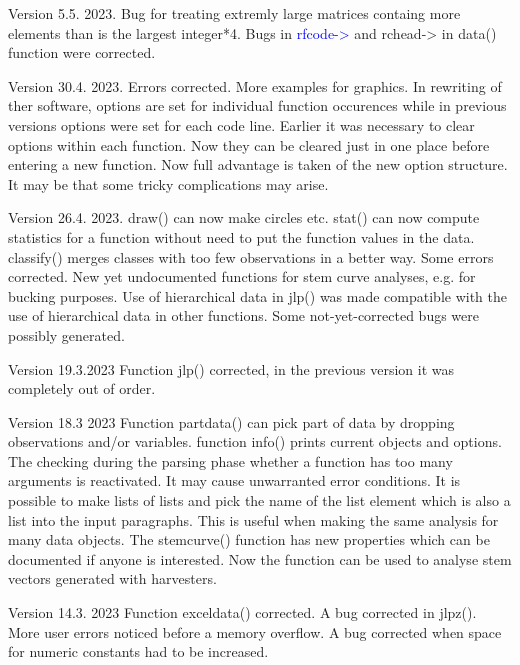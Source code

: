Version 5.5. 2023. Bug for treating extremly large matrices containg more elements than is the largest integer*4. 
Bugs in \textcolor{blue}{rfcode->} and rchead-> in \textcolor{VioletRed}{data}() function were corrected. 
 
Version 30.4. 2023. Errors corrected. More examples for graphics. In rewriting of ther software, 
options are set for individual function occurences while in previous versions 
options were set for each code line. Earlier it was necessary to clear options within each 
function. Now they can be cleared just in one place before entering a new function. Now 
full advantage is taken of the new option structure. It may be that some tricky complications 
may arise. 
 
Version 26.4. 2023. \textcolor{VioletRed}{draw}() can now make circles etc. \textcolor{VioletRed}{stat}() can now compute statistics 
for a function without need to put the function values in the data. \textcolor{VioletRed}{classify}() merges classes 
with too few observations in a better way. 
Some errors corrected. New yet undocumented functions for stem curve 
analyses, e.g. for bucking purposes. Use of hierarchical data in \textcolor{VioletRed}{jlp}() was made compatible 
with the use of hierarchical data in other functions. Some not-yet-corrected bugs were 
possibly generated. 
 
Version 19.3.2023 Function \textcolor{VioletRed}{jlp}() corrected, in the previous version it was 
completely out of order. 
 
Version 18.3 2023 Function \textcolor{VioletRed}{partdata}() can pick part of data by dropping 
observations and/or variables. function \textcolor{VioletRed}{info}() prints current objects and options. 
The checking during the parsing phase whether a function has too many arguments 
is reactivated. It may cause unwarranted error conditions. 
It is possible to make lists of lists and pick the name of the list element which 
is also a list into the input paragraphs. This is useful when making the same 
analysis for many data objects. The \textcolor{VioletRed}{stemcurve}() function has new properties which 
can be documented if anyone is interested. Now the function can be used to 
analyse stem vectors generated with harvesters. 
 
Version 14.3. 2023 Function \textcolor{VioletRed}{exceldata}() corrected. A bug corrected in \textcolor{VioletRed}{jlpz}(). 
More user errors noticed before a memory overflow. A bug corrected when space 
for numeric constants had to be increased. 
 

